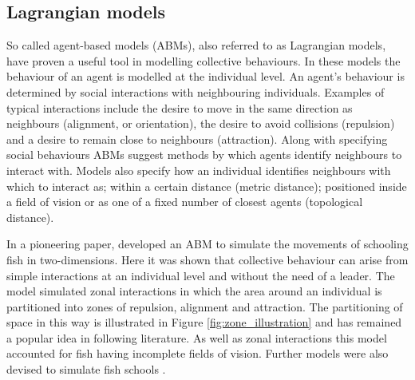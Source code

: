 \subsection{Lagrangian models}
\label{ssec:lagrangian_models}

So called agent-based models (ABMs), also referred to as Lagrangian models, have proven a useful tool in modelling collective behaviours. In these models the behaviour of an agent is modelled at the individual level. An agent's behaviour is determined by social interactions with neighbouring individuals. Examples of typical interactions include the desire to move in the same direction as neighbours (alignment, or orientation), the desire to avoid collisions (repulsion) and a desire to remain close to neighbours (attraction). Along with specifying social behaviours ABMs suggest methods by which agents identify neighbours to interact with. Models also specify how an individual identifies neighbours with which to interact as; within a certain distance (metric distance); positioned inside a field of vision or as one of a fixed number of closest agents (topological distance).

In a pioneering paper, \citet{aoki82} developed an ABM to simulate the movements of schooling fish in two-dimensions. Here it was shown that collective behaviour can arise from simple interactions at an individual level and without the need of a leader. The model simulated zonal interactions in which the area around an individual is partitioned into zones of repulsion, alignment and attraction. The partitioning of space in this way is illustrated in Figure \ref{fig:zone_illustration} and has remained a popular idea in following literature. As well as zonal interactions this model accounted for fish having incomplete fields of vision. Further models were also devised to simulate fish schools \citep{okubo86, huth92}.

